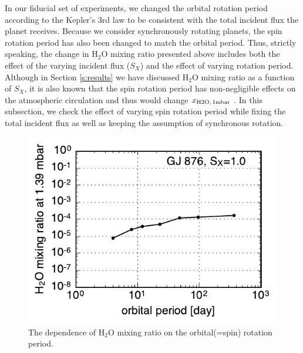 \documentclass[11pt,numberedappendix,twocolappendix,]{emulateapj}
\def\water{H$_2$O }
\def\xwater{$x_{\rm H2O,\,1mbar}$ }
\begin{document}
In our fiducial set of experiments, we changed the orbital rotation period according to the Kepler's 3rd law to be consistent with the total incident flux the planet receives. 
Because we consider synchronously rotating planets, the spin rotation period has also been changed to match the orbital period. 
Thus, strictly speaking, the change in \water mixing ratio presented above includes both the effect of the varying incident flux ($S_X$) and the effect of varying rotation period. 
Although in Section \ref{s:results} we have discussed \water mixing ratio as a function of $S_X$, it is also known that the spin rotation period has non-negligible effects on the atmospheric circulation \citep{Yang2013, Kopparapu2016, Way2016} and thus would change \xwater. 
In this subsection, we check the effect of varying spin rotation period while fixing the total incident flux as well as keeping the assumption of synchronous rotation. 


\begin{figure}[!h]
    \begin{center}
    \includegraphics[width=\hsize]{fig/xH2O_Prot.pdf}
    \end{center}
\caption{The dependence of \water mixing ratio on the orbital(=spin) rotation period. }                                                                                                             
\label{fig:changeP}
\end{figure}
\end{document}
